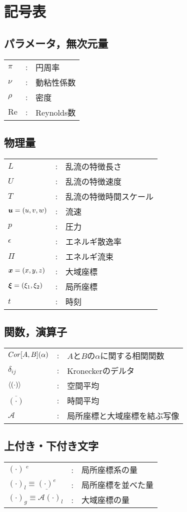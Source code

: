 \chapter*{記号表}

\section*{パラメータ，無次元量}
\begin{tabular}{lll}
\(\pi\)  & : & 円周率 \\
\(\nu\)  & : & 動粘性係数 \\
\(\rho\) & : & 密度 \\
\(\mathrm{Re}\) & : & Reynolds数
\end{tabular}

\section*{物理量}
\begin{tabular}{lll}
\(L\) & : & 乱流の特徴長さ \\
\(U\) & : & 乱流の特徴速度 \\
\(T\) & : & 乱流の特徴時間スケール \\ \hline
\(\vb*{u}=(u,v,w)\)  & : & 流速 \\
\(p\) & : & 圧力 \\
\(\epsilon\) & : & エネルギ散逸率 \\
\(\varPi\) & : & エネルギ流束 \\ \hline
\(\vb*{x}=(x,y,z)\) & : & 大域座標 \\
\(\vb*{\xi}=(\xi_1,\xi_2)\) & : & 局所座標 \\
\(t\) & : & 時刻
\end{tabular}

\section*{関数，演算子}
\begin{tabular}{lll}
\(Cor\qty[A,B]\qty(\alpha)\) & : & \(A\)と\(B\)の\(\alpha\)に関する相関関数 \\
\(\delta_{ij}\) & : & Kroneckerのデルタ \\
\(\expval{(\cdot)}\) & : & 空間平均 \\
\(\overline{(\cdot)}\) & : & 時間平均 \\
\(\mathcal{A}\) & : & 局所座標と大域座標を結ぶ写像
\end{tabular}

\section*{上付き・下付き文字}
\begin{tabular}{lll}
  \((\cdot) ~^e\) & : & 局所座標系の量 \\
  \((\cdot)_l \equiv \underline{(\cdot)^e}\) & : & 局所座標を並べた量 \\
  \((\cdot)_g \equiv \mathcal{A} (\cdot)_l\) & : & 大域座標の量 \\
\end{tabular}
